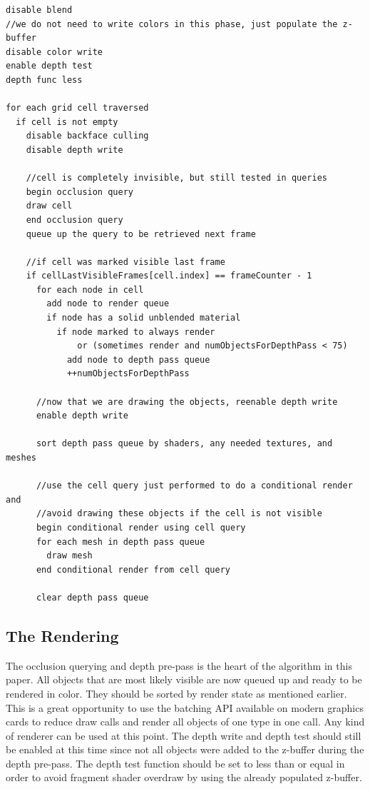 \documentclass[12pt]{ucthesis}
\begin{document}
\begin{lstlisting}
disable blend
//we do not need to write colors in this phase, just populate the z-buffer
disable color write
enable depth test
depth func less

for each grid cell traversed
  if cell is not empty
    disable backface culling
    disable depth write

    //cell is completely invisible, but still tested in queries	
    begin occlusion query
    draw cell
    end occlusion query
    queue up the query to be retrieved next frame

    //if cell was marked visible last frame
    if cellLastVisibleFrames[cell.index] == frameCounter - 1
      for each node in cell
        add node to render queue
        if node has a solid unblended material
          if node marked to always render 
              or (sometimes render and numObjectsForDepthPass < 75)
            add node to depth pass queue
            ++numObjectsForDepthPass

      //now that we are drawing the objects, reenable depth write
      enable depth write

      sort depth pass queue by shaders, any needed textures, and meshes

      //use the cell query just performed to do a conditional render and
      //avoid drawing these objects if the cell is not visible
      begin conditional render using cell query
      for each mesh in depth pass queue
        draw mesh
      end conditional render from cell query

      clear depth pass queue
\end{lstlisting}

\subsection {The Rendering}
\label{the-rendering}

The occlusion querying and depth pre-pass is the heart of the algorithm in this paper.
All objects that are most likely visible are now queued up and ready to be rendered in color.
They should be sorted by render state as mentioned earlier.
This is a great opportunity to use the batching API available on modern graphics cards to reduce draw calls and render all objects of one type in one call.
Any kind of renderer can be used at this point.
The depth write and depth test should still be enabled at this time since not all objects were added to the z-buffer during the depth pre-pass.
The depth test function should be set to less than or equal in order to avoid fragment shader overdraw by using the already populated z-buffer.
\end{document}
